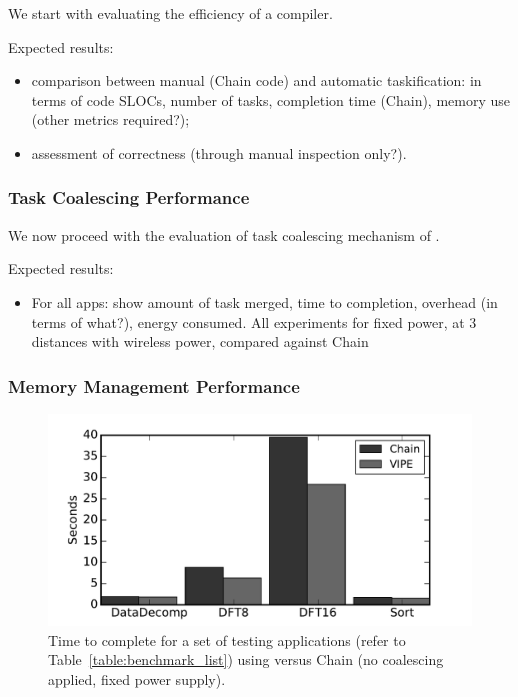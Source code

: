 We start with evaluating the efficiency of a \sys compiler. 

Expected results:
\begin{itemize}
	\item comparison between manual (Chain code) and automatic taskification: in terms of code SLOCs, number of tasks, completion time (Chain), memory use (other metrics required?); 
	\item assessment of correctness (through manual inspection only?).
\end{itemize}


\subsubsection{Task Coalescing Performance}
\label{sec:results_coalescing}

We now proceed with the evaluation of task coalescing mechanism of \sys.

Expected results:
\begin{itemize}
	\item For all apps: show amount of task merged, time to completion, overhead (in terms of what?), energy consumed. All experiments for fixed power, at 3 distances with wireless power, compared against Chain 
\end{itemize} 


\subsubsection{Memory Management Performance}
\label{sec:results_memory_management}

\begin{figure}
	\centering
	\includegraphics[width=\columnwidth]{figures/chain_vipe}
	\caption{Time to complete for a set of testing applications (refer to Table~\ref{table:benchmark_list}) using \sys versus Chain (no coalescing applied, fixed power supply). }
	\label{fig:IPOSPerformance}
\end{figure}

